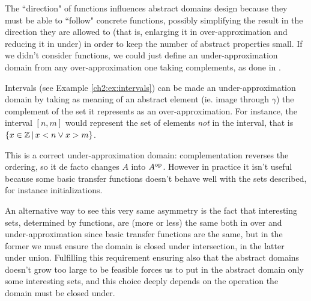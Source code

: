 The ``direction" of functions influences abstract domains design because they must be able to ``follow" concrete functions, possibly simplifying the result in the direction they are allowed to (that is, enlarging it in over-approximation and reducing it in under) in order to keep the number of abstract properties small.
If we didn't consider functions, we could just define an under-approximation domain from any over-approximation one taking complements, as done in \cite{lev-backward-analysis-complement}.
\begin{example}\label{ch2-5:ex:complement-intervals}
	Intervals (see Example \ref{ch2:ex:intervals}) can be made an under-approximation domain by taking as meaning of an abstract element (ie. image through $\gamma$) the complement of the set it represents as an over-approximation.
	For instance, the interval $[n, m]$ would represent the set of elements \textit{not} in the interval, that is $\{ x \in \mathbb{Z} \,\vert\, x < n \lor x > m \}$.

	This is a correct under-approximation domain: complementation reverses the ordering, so it de facto changes $A$ into $A^{\text{op}}$. However in practice it isn't useful because some basic transfer functions doesn't behave well with the sets described, for instance initializations.
\end{example}

An alternative way to see this very same asymmetry is the fact that interesting sets, determined by functions, are (more or less) the same both in over and under-approximation since basic transfer functions are the same, but in the former we must ensure the domain is closed under intersection, in the latter under union. Fulfilling this requirement ensuring also that the abstract domains doesn't grow too large to be feasible forces us to put in the abstract domain only some interesting sets, and this choice deeply depends on the operation the domain must be closed under.


